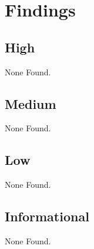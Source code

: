 \section{Findings}
\subsection{High}
    None Found.
\subsection{Medium}
    None Found.
\subsection{Low}
    None Found.
\subsection{Informational}
    None Found.
